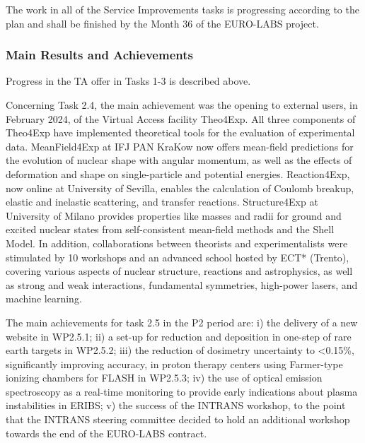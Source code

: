 The work in all of the Service Improvements tasks is progressing according to the plan and shall be finished by the Month 36 of the EURO-LABS project.


\subsubsection*{Main Results and Achievements}


Progress in the TA offer in Tasks 1-3 is described above. 

Concerning Task 2.4, 
the main achievement was the opening to external users, in February 2024, of the Virtual Access facility Theo4Exp. All three components of Theo4Exp have implemented theoretical tools for the evaluation of experimental data. MeanField4Exp at IFJ PAN KraKow now offers mean-field predictions for the evolution of nuclear shape with angular momentum, as well as the effects of deformation and shape on single-particle and potential energies. Reaction4Exp, now online at University of Sevilla, enables the calculation of Coulomb breakup, elastic and inelastic scattering, and transfer reactions. Structure4Exp at University of Milano provides properties like masses and radii for ground and excited nuclear states from self-consistent mean-field methods and the Shell Model. In addition, collaborations between theorists and experimentalists were stimulated by 10 workshops and an advanced school hosted by ECT* (Trento), covering various aspects of nuclear structure, reactions and astrophysics, as well as strong and weak interactions, fundamental symmetries, high-power lasers, and machine learning.

The main achievements for task 2.5 in the P2 period are: i) the delivery of a new website in WP2.5.1; ii) a set-up for reduction and deposition in one-step of rare earth targets in WP2.5.2; iii) the reduction of dosimetry uncertainty to <0.15\%, significantly improving accuracy, in proton therapy centers using Farmer-type ionizing chambers for FLASH in WP2.5.3; iv) the use of optical emission spectroscopy as a real-time monitoring to provide early indications about plasma instabilities in ERIBS; v) the success of the INTRANS workshop, to the point that the INTRANS steering committee decided to hold an additional workshop towards the end of the EURO-LABS contract.





